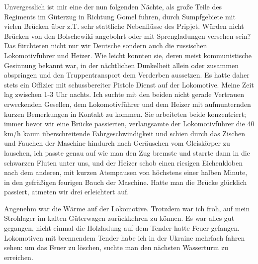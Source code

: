 \documentclass[a5paper,pagesize,10pt,twoside=true]{scrbook}
\begin{document}
Unvergesslich ist mir eine der nun folgenden Nächte, als große Teile des Regiments im Güterzug in Richtung Gomel fuhren, durch Sumpfgebiete mit vielen Brücken über z.T. sehr stattliche Nebenflüsse des Pripjet. Würden nicht Brücken von den Bolschewiki angebohrt oder mit Sprengladungen versehen sein? Das fürchteten nicht nur wir Deutsche sondern auch die russischen Lokomotivführer und Heizer. Wie leicht konnten sie, deren meist kommunistische Gesinnung bekannt war, in der nächtlichen Dunkelheit allein oder zusammen abspringen und den Truppentransport dem Verderben aussetzen. Es hatte daher stets ein Offizier mit schussbereiter Pistole Dienst auf der Lokomotive. Meine Zeit lag zwischen 1-3 Uhr nachts. Ich suchte mit den beiden nicht gerade Vertrauen erweckenden Gesellen, dem Lokomotivführer und dem Heizer mit aufmunternden kurzen Bemerkungen in Kontakt zu kommen. Sie arbeiteten beide konzentriert; immer bevor wir eine Brücke passierten, verlangsamte der Lokomotivführer die 40 km/h kaum überschreitende Fahrgeschwindigkeit und schien durch das Zischen und Fauchen der Maschine hindurch nach Geräuschen vom Gleiskörper zu lauschen, ich passte genau auf wie man den Zug bremste und starrte dann in die schwarzen Fluten unter uns, und der Heizer schob einen riesigen Eichenkloben nach dem anderen, mit kurzen Atempausen von höchstens einer halben Minute, in den gefräßigen feurigen Bauch der Maschine. Hatte man die Brücke glücklich passiert, atmeten wir drei erleichtert auf.

Angenehm war die Wärme auf der Lokomotive. Trotzdem war ich froh, auf mein Strohlager im kalten Güterwagen zurückkehren zu können. Es war alles gut gegangen, nicht einmal die Holzladung auf dem Tender hatte Feuer gefangen. Lokomotiven mit brennendem Tender habe ich in der Ukraine mehrfach fahren sehen: um das Feuer zu löschen, suchte man den nächsten Wasserturm zu erreichen.
\end{document}
